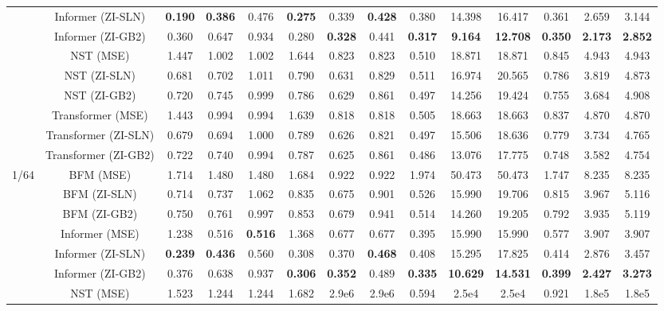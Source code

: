\begin{table}[htbp]
{\begin{tabular}{lccccccccccccc}
 & Informer (ZI-SLN) & \textbf{0.190} & \textbf{0.386} & 0.476 & \textbf{0.275} & 0.339 & \textbf{0.428} & 0.380 & 14.398 & 16.417 & 0.361 & 2.659 & 3.144 \\
 & Informer (ZI-GB2) & 0.360 & 0.647 & 0.934 & 0.280 & \textbf{0.328} & 0.441 & \textbf{0.317} & \textbf{9.164} & \textbf{12.708} & \textbf{0.350} & \textbf{2.173} & \textbf{2.852} \\
 & NST (MSE) & 1.447 & 1.002 & 1.002 & 1.644 & 0.823 & 0.823 & 0.510 & 18.871 & 18.871 & 0.845 & 4.943 & 4.943 \\
 & NST (ZI-SLN) & 0.681 & 0.702 & 1.011 & 0.790 & 0.631 & 0.829 & 0.511 & 16.974 & 20.565 & 0.786 & 3.819 & 4.873 \\
 & NST (ZI-GB2) & 0.720 & 0.745 & 0.999 & 0.786 & 0.629 & 0.861 & 0.497 & 14.256 & 19.424 & 0.755 & 3.684 & 4.908 \\
 & Transformer (MSE) & 1.443 & 0.994 & 0.994 & 1.639 & 0.818 & 0.818 & 0.505 & 18.663 & 18.663 & 0.837 & 4.870 & 4.870 \\
 & Transformer (ZI-SLN) & 0.679 & 0.694 & 1.000 & 0.789 & 0.626 & 0.821 & 0.497 & 15.506 & 18.636 & 0.779 & 3.734 & 4.765 \\
 & Transformer (ZI-GB2) & 0.722 & 0.740 & 0.994 & 0.787 & 0.625 & 0.861 & 0.486 & 13.076 & 17.775 & 0.748 & 3.582 & 4.754 \\
\midrule
\multirow{9}{*}{1/64} & BFM (MSE) & 1.714 & 1.480 & 1.480 & 1.684 & 0.922 & 0.922 & 1.974 & 50.473 & 50.473 & 1.747 & 8.235 & 8.235 \\
 & BFM (ZI-SLN) & 0.714 & 0.737 & 1.062 & 0.835 & 0.675 & 0.901 & 0.526 & 15.990 & 19.706 & 0.815 & 3.967 & 5.116 \\
 & BFM (ZI-GB2) & 0.750 & 0.761 & 0.997 & 0.853 & 0.679 & 0.941 & 0.514 & 14.260 & 19.205 & 0.792 & 3.935 & 5.119 \\
 & Informer (MSE) & 1.238 & 0.516 & \textbf{0.516} & 1.368 & 0.677 & 0.677 & 0.395 & 15.990 & 15.990 & 0.577 & 3.907 & 3.907 \\
 & Informer (ZI-SLN) & \textbf{0.239} & \textbf{0.436} & 0.560 & 0.308 & 0.370 & \textbf{0.468} & 0.408 & 15.295 & 17.825 & 0.414 & 2.876 & 3.457 \\
 & Informer (ZI-GB2) & 0.376 & 0.638 & 0.937 & \textbf{0.306} & \textbf{0.352} & 0.489 & \textbf{0.335} & \textbf{10.629} & \textbf{14.531} & \textbf{0.399} & \textbf{2.427} & \textbf{3.273} \\
 & NST (MSE) & 1.523 & 1.244 & 1.244 & 1.682 & 2.9e6 & 2.9e6 & 0.594 & 2.5e4 & 2.5e4 & 0.921 & 1.8e5 & 1.8e5 \\

\end{tabular}}
\end{table}
